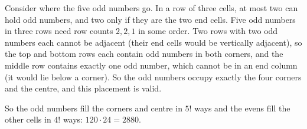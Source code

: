 Consider where the five odd numbers go. In a row of three cells, at most two can hold odd numbers, and two only if they are the two end cells. Five odd numbers in three rows need row counts $2,2,1$ in some order. Two rows with two odd numbers each cannot be adjacent (their end cells would be vertically adjacent), so the top and bottom rows each contain odd numbers in both corners, and the middle row contains exactly one odd number, which cannot be in an end column (it would lie below a corner). So the odd numbers occupy exactly the four corners and the centre, and this placement is valid.

So the odd numbers fill the corners and centre in $5!$ ways and the evens fill the other cells in $4!$ ways: $120\cdot24=\boxed{2880}$.
